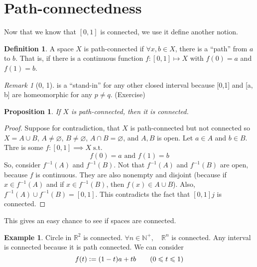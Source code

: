 \documentclass[12pt]{amsart}
\newcommand{\bbR}{\mathbb{R}}
\newcommand{\bbN}{\mathbb{N}}
\newcommand{\suchthat}{\operatorname{s.t.}}
\theoremstyle{plain}
\newtheorem*{prop}{Proposition}
\theoremstyle{remark}
\newtheorem*{rmk}{Remark}
\theoremstyle{definition}
\newtheorem*{define}{Definition}
\newtheorem*{eg}{Example}
\begin{document}
\section*{Path-connectedness}
Now that we know that $[0,1]$ is connected, we use it define another notion.

\begin{define}
	A space $X$ is path-connected if $\forall x,b \in X$, there is a ``path'' from $a$ to $b$. That is, if there is a continuous function $f:[0,1] \mapsto X$ with $f(0) = a$ and $f(1) = b$.
\end{define}

\begin{rmk}
	[0, 1] is a ``stand-in'' for any other closed interval because [0,1] and [a, b] are homeomorphic for any $p \neq q$. (Exercise)
\end{rmk}

\begin{prop}
	If $X$ is path-connected, then it is connected.
\end{prop}

\begin{proof}
	Suppose for contradiction, that $X$ is path-connected but not connected so $X = A \cup B$, $A \neq \varnothing$, $B \neq \varnothing$, $A \cap B = \varnothing$, and $A,B$ is open.
	\newline
	Let $a \in A$ and $b \in B$. Thre is some $f:[0,1] \implies X \suchthat$
	\begin{equation*}
		f(0) = a \text{ and } f(1) = b 
	\end{equation*}
	So, consider $f^{-1}(A)$ and $f^{-1}(B)$. Not that $f^{-1}(A)$ and $f^{-1}(B)$ are open, because $f$ is continuous. They are also nonempty and disjoint (because if $x\in f^{-1}(A)$ and if $x \in f^{-1}(B)$, then $f(x) \in A \cup B$).
	\newline
	Also, $f^{-1}(A) \cup f^{-1}(B) = [0, 1]$. This contradicts the fact that $[0,1]j$ is connected.
\end{proof}

This gives an easy chance to see if spaces are connected.

\begin{eg}
	\hfill
	\newline
	Circle in $\bbR^2$ is connected.
	\newline
	$\forall n\in \bbN^{+},\quad \bbR^n$ is connected.
	\newline
	Any interval is connected because it is path connected. We can consider
	\begin{equation*}
		f(t) \vcentcolon = (1-t)a + tb \quad\quad(0\leqslant t \leqslant 1)
	\end{equation*}
\end{eg}
\end{document}
